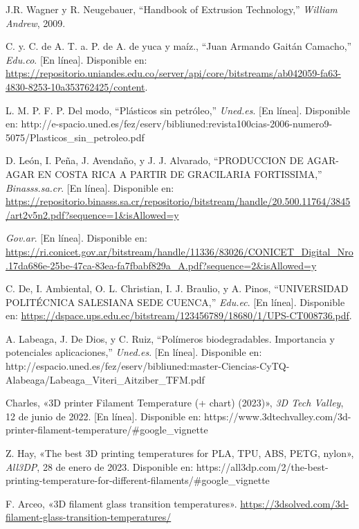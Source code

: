 \documentclass[14pt,oneside]{extarticle} %
\begin{document}
\begin{thebibliography}{5}
    J.R. Wagner y R. Neugebauer, 
    ``Handbook of Extrusion Technology,'' 
    \textit{William Andrew}, 2009.

    C. y. C. de A. T. a. P. de A. de yuca y maíz., “Juan Armando Gaitán Camacho,” \textit{Edu.co}. [En línea]. Disponible en: \url{https://repositorio.uniandes.edu.co/server/api/core/bitstreams/ab042059-fa63-4830-8253-10a353762425/content}.

    L. M. P. F. P. Del modo, “Plásticos sin petróleo,” \textit{Uned.es}. [En línea]. Disponible en: http://e-spacio.uned.es/fez/eserv/bibliuned:revista100cias-2006-numero9-5075/Plasticos\_sin\_petroleo.pdf

    D. León, I. Peña, J. Avendaño, y J. J. Alvarado, “PRODUCCION DE AGAR-AGAR EN COSTA RICA A PARTIR DE GRACILARIA FORTISSIMA,” \textit{Binasss.sa.cr}. [En línea]. Disponible en: \url{https://repositorio.binasss.sa.cr/repositorio/bitstream/handle/20.500.11764/3845/art2v5n2.pdf?sequence=1&isAllowed=y}

    \textit{Gov.ar}. [En línea]. Disponible en: \url{https://ri.conicet.gov.ar/bitstream/handle/11336/83026/CONICET_Digital_Nro.17da686e-25be-47ca-83ea-fa7fbabf829a_A.pdf?sequence=2&isAllowed=y}

    C. De, I. Ambiental, O. L. Christian, I. J. Braulio, y A. Pinos, “UNIVERSIDAD POLITÉCNICA SALESIANA SEDE CUENCA,” \textit{Edu.ec}. [En línea]. Disponible en: \url{https://dspace.ups.edu.ec/bitstream/123456789/18680/1/UPS-CT008736.pdf}.

    A. Labeaga, J. De Dios, y C. Ruiz, “Polímeros biodegradables. Importancia y potenciales aplicaciones,” \textit{Uned.es}. [En línea]. Disponible en: http://espacio.uned.es/fez/eserv/bibliuned:master-Ciencias-CyTQ-Alabeaga/Labeaga\_Viteri\_Aitziber\_TFM.pdf

    Charles, «3D printer Filament Temperature (+ chart) (2023)», \textit{3D Tech Valley}, 12 de junio de 2022. [En línea]. Disponible en: https://www.3dtechvalley.com/3d-printer-filament-temperature/#google\_vignette

    Z. Hay, «The best 3D printing temperatures for PLA, TPU, ABS, PETG, nylon», \textit{All3DP}, 28 de enero de 2023. Disponible en: https://all3dp.com/2/the-best-printing-temperature-for-different-filaments/#google\_vignette

    F. Arceo, «3D filament glass transition temperatures». \url{https://3dsolved.com/3d-filament-glass-transition-temperatures/}


\end{thebibliography}
\end{document}
